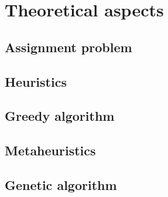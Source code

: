 \renewcommand{\documentname}{Theoretical Aspects}

\chapter{Theoretical aspects}\label{theory}


\section{Assignment problem}


\section{Heuristics}


\section{Greedy algorithm}


\section{Metaheuristics}


\section{Genetic algorithm}

